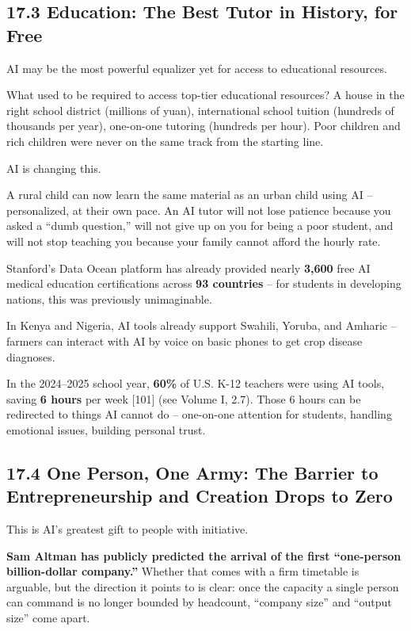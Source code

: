 \documentclass[11pt,a4paper]{article}
\begin{document}
\subsection{17.3 Education: The Best Tutor in History, for Free}

AI may be the most powerful equalizer yet for access to educational resources.

What used to be required to access top-tier educational resources? A house in the right school district (millions of yuan), international school tuition (hundreds of thousands per year), one-on-one tutoring (hundreds per hour). Poor children and rich children were never on the same track from the starting line.

AI is changing this.

A rural child can now learn the same material as an urban child using AI -- personalized, at their own pace. An AI tutor will not lose patience because you asked a ``dumb question,'' will not give up on you for being a poor student, and will not stop teaching you because your family cannot afford the hourly rate.

Stanford's Data Ocean platform has already provided nearly \textbf{3,600} free AI medical education certifications across \textbf{93 countries} -- for students in developing nations, this was previously unimaginable.

In Kenya and Nigeria, AI tools already support Swahili, Yoruba, and Amharic -- farmers can interact with AI by voice on basic phones to get crop disease diagnoses.

In the 2024--2025 school year, \textbf{60\%} of U.S. K-12 teachers were using AI tools, saving \textbf{6 hours} per week [101] (see Volume I, 2.7). Those 6 hours can be redirected to things AI cannot do -- one-on-one attention for students, handling emotional issues, building personal trust.

\subsection{17.4 One Person, One Army: The Barrier to Entrepreneurship and Creation Drops to Zero}

This is AI's greatest gift to people with initiative.

\textbf{Sam Altman has publicly predicted the arrival of the first ``one-person billion-dollar company.''} Whether that comes with a firm timetable is arguable, but the direction it points to is clear: once the capacity a single person can command is no longer bounded by headcount, ``company size'' and ``output size'' come apart.
\end{document}
